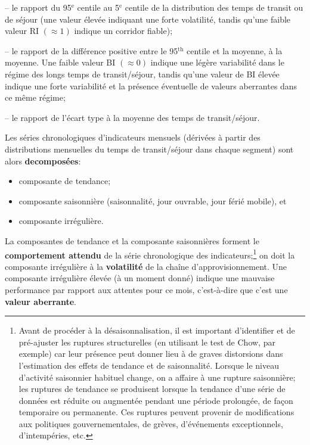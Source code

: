 \begin{Exemple}
\begin{description}[noitemsep]
\item[indicateur de fiabilit\'e (RI)] -- le rapport du 95$^{\text{e}}$ centile au 5$^{\text{e}}$ centile de la distribution des temps de transit ou de s\'ejour (une valeur \'elev\'ee indiquant une forte volatilit\'e, tandis qu'une faible valeur RI $(\approx 1)$ indique un corridor fiable);
\item[indice tampon (BI)] -- le rapport de la diff\'erence positive entre le 95$^{\text{th}}$ centile et la moyenne, \`a la moyenne. Une faible valeur BI $(\approx 0)$ indique une l\'eg\`ere  variabilit\'e dans le r\'egime des longs temps de transit/s\'ejour, tandis qu'une valeur de BI \'elev\'ee indique une forte variabilit\'e  et la pr\'esence \'eventuelle de valeurs aberrantes dans ce m\^eme r\'egime;
\item[coefficient de variation (CV)] -- le rapport de l'\'ecart type \`a la moyenne des temps de transit/s\'ejour.  
\end{description}
Les séries chronologiques d'indicateurs mensuels (dérivées \`a partir des distributions mensuelles du temps de transit/s\'ejour dans chaque segment) sont alors \textbf{decomposées}:
\begin{itemize}[noitemsep]
\item composante de tendance;
\item composante saisonnière (saisonnalité, jour ouvrable, jour férié mobile), et 
\item composante irrégulière.
\end{itemize}
\noindent La composantes de tendance et la composante saisonnières forment le \textbf{comportement attendu} de la série chro\-no\-lo\-gi\-que des indicateurs;\footnote{Avant de procéder à la désaisonnalisation, il est important d'identifier et de pré-ajuster les ruptures structurelles (en utilisant le test de Chow, par exemple) car leur présence peut donner lieu à de graves distorsions dans l'estimation des effets de tendance et de saisonnalit\'e. Lorsque le niveau d'activité saisonnier habituel change, on a affaire \`a une rupture saisonni\`ere; les ruptures de tendance se produisent lorsque la tendance d'une série de données est réduite ou augmentée pendant une période prolongée, de façon temporaire ou permanente. Ces ruptures peuvent provenir de modifications aux politiques gouvernementales, de grèves, d'événements exceptionnels, d'intempéries, etc.} on doit la composante irrégulière \`a la \textbf{volatilit\'e} de la chaîne d'approvisionnement. Une composante irrégulière élevée (à un moment donné) indique une mauvaise performance par rapport aux attentes pour ce mois, c'est-à-dire que c'est une \textbf{valeur aberrante}.  

\end{Exemple}
